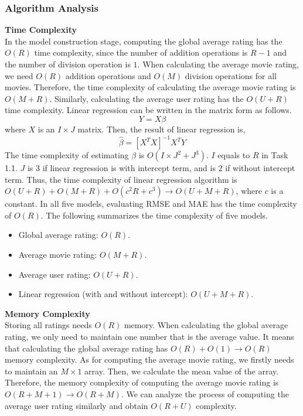 \documentclass{article}
\begin{document}
\subsubsection{Algorithm Analysis}
\noindent\textbf{Time Complexity}\\
In the model construction stage, computing the global average rating has the $O(R)$ time complexity, since the number of addition operations is $R - 1$ and the number of division operation is $1$. When calculating the average movie rating, we need  $O(R)$ addition operations and $O(M)$ division operations for all movies. Therefore, the time complexity of calculating the average movie rating is $O(M + R)$. Similarly, calculating the average user rating has the $O(U + R)$ time complexity. Linear regression can be written in the matrix form as follows.
$$
Y = X\beta
$$
where $X$ is an $I\times J$ matrix. Then, the result of linear regression is,
$$
\hat{\beta} = \left[ X^TX \right]^{-1} X^TY
$$
The time complexity of estimating $\beta$ is $O(I\times J^2 + J^3)$. $I$ equals to $R$ in Task 1.1. $J$ is $3$ if linear regression is with intercept term, and is $2$ if without intercept term. Thus, the time complexity of linear regression algorithm is $O(U + R) + O(M + R) + O(c^2R + c^3)\rightarrow O(U + M + R)$, where $c$ is a constant. In all five models, evaluating RMSE and MAE has the time complexity of $O(R)$. The following summarizes the time complexity of five models.
\begin{itemize}
    \item Global average rating: $O(R)$.
    \item Average movie rating: $O(M + R)$.
    \item Average user rating: $O(U + R)$.
    \item Linear regression (with and without intercept): $O(U + M + R)$.
\end{itemize}
\par
\vspace{0.3cm}
\noindent\textbf{Memory Complexity}\\
Storing all ratings needs $O(R)$ memory. When calculating the global average rating, we only need to maintain one number that is the average value. It means that calculating the global average rating has $O(R) + O(1)\rightarrow O(R)$ memory complexity. As for computing the average movie rating, we firstly needs to maintain an $M\times 1$ array. Then, we calculate the mean value of the array. Therefore, the memory complexity of computing the average movie rating is $O(R + M + 1) \rightarrow O(R + M)$. We can analyze the process of computing the average user rating similarly and obtain $O(R + U)$ complexity.
\end{document}
